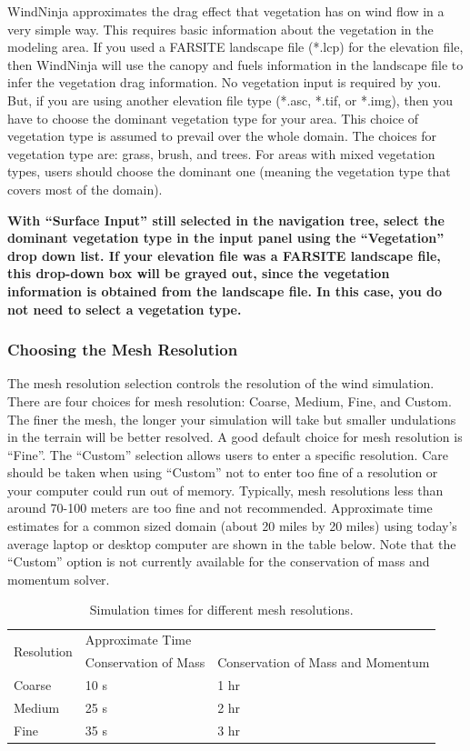 \documentclass[12pt]{article}
\begin{document}
WindNinja approximates the drag effect that vegetation has on wind flow in a very simple way.  This requires basic information about the vegetation in the modeling area.  If you used a FARSITE landscape file (*.lcp) for the elevation file, then WindNinja will use the canopy and fuels information in the landscape file to infer the vegetation drag information.  No vegetation input is required by you.  But, if you are using another elevation file type (*.asc, *.tif, or *.img), then you have to choose the dominant vegetation type for your area.  This choice of vegetation type is assumed to prevail over the whole domain.  The choices for vegetation type are:  grass, brush, and trees.  For areas with mixed vegetation types, users should choose the dominant one (meaning the vegetation type that covers most of the domain).

\textbf{\color{red} With “Surface Input” still selected in the navigation tree, select the dominant vegetation type in the input panel using the “Vegetation” drop down list.  If your elevation file was a FARSITE landscape file, this drop-down box will be grayed out, since the vegetation information is obtained from the landscape file.  In this case, you do not need to select a vegetation type.}

\subsubsection{Choosing the Mesh Resolution}

The mesh resolution selection controls the resolution of the wind simulation.  There are four choices for mesh resolution: Coarse, Medium, Fine, and Custom.  The finer the mesh, the longer your simulation will take but smaller undulations in the terrain will be better resolved.  A good default choice for mesh resolution is “Fine”.  The “Custom” selection allows users to enter a specific resolution.  Care should be taken when using “Custom” not to enter too fine of a resolution or your computer could run out of memory.  Typically, mesh resolutions less than around 70-100 meters are too fine and not recommended.  Approximate time estimates for a common sized domain (about 20 miles by 20 miles) using today’s average laptop or desktop computer are shown in the table below. Note that the “Custom” option is not currently available for the conservation of mass and momentum solver. 

\begin{table}[]
\centering
\caption{Simulation times for different mesh resolutions.}
\label{res_table}
\begin{tabular}{lll}
\toprule
\multirow{2}{*}{Resolution} & \multicolumn{2}{l}{Approximate Time} \\ \cmidrule(l){2-3} 
 & Conservation of Mass & Conservation of Mass and Momentum \\ \cmidrule(r){1-1}
Coarse & 10 s & 1 hr \\
Medium & 25 s & 2 hr \\
Fine & 35 s & 3 hr \\ \bottomrule
\end{tabular}
\end{table}
\end{document}
